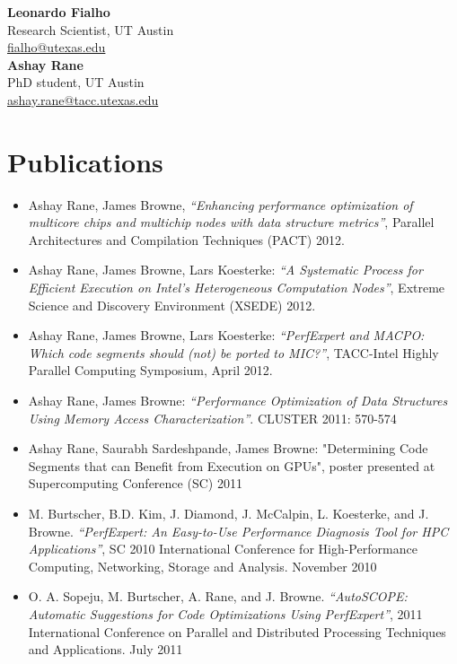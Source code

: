 \noindent\textbf{Leonardo Fialho}\\
Research Scientist, UT Austin\\
\href{mailto:fialho@utexas.edu}{fialho@utexas.edu}\\

\noindent\textbf{Ashay Rane}\\
PhD student, UT Austin\\
\href{mailto:ashay.rane@tacc.utexas.edu}{ashay.rane@tacc.utexas.edu}

\section{Publications}

\begin{itemize}
	\item Ashay Rane, James Browne, \textit{``Enhancing performance optimization of multicore chips and multichip nodes with data structure metrics''}, Parallel Architectures and Compilation Techniques (PACT) 2012.
	\item Ashay Rane, James Browne, Lars Koesterke: \textit{``A Systematic Process for Efficient Execution on Intel's Heterogeneous Computation Nodes''}, Extreme Science and Discovery Environment (XSEDE) 2012.
	\item Ashay Rane, James Browne, Lars Koesterke: \textit{``PerfExpert and MACPO: Which code segments should (not) be ported to MIC?''}, TACC-Intel Highly Parallel Computing Symposium, April 2012.
	\item Ashay Rane, James Browne: \textit{``Performance Optimization of Data Structures Using Memory Access Characterization''}. CLUSTER 2011: 570-574
	\item Ashay Rane, Saurabh Sardeshpande, James Browne: "Determining Code Segments that can Benefit from Execution on GPUs", poster presented at Supercomputing Conference (SC) 2011
	\item M. Burtscher, B.D. Kim, J. Diamond, J. McCalpin, L. Koesterke, and J. Browne. \textit{``PerfExpert: An Easy-to-Use Performance Diagnosis Tool for HPC Applications''}, SC 2010 International Conference for High-Performance Computing, Networking, Storage and Analysis. November 2010
	\item O. A. Sopeju, M. Burtscher, A. Rane, and J. Browne. \textit{``AutoSCOPE: Automatic Suggestions for Code Optimizations Using PerfExpert''}, 2011 International Conference on Parallel and Distributed Processing Techniques and Applications. July 2011
\end{itemize}

